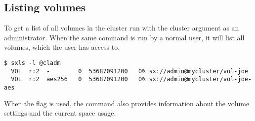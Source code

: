 \subsection{Listing volumes}
To get a list of all volumes in the cluster run  with the cluster
argument as an administrator. When the same command is run by a normal user,
it will list all volumes, which the user has access to.
\begin{lstlisting}
$ sxls -l @cladm
  VOL  r:2  -        0  53687091200   0% sx://admin@mycluster/vol-joe
  VOL  r:2  aes256   0  53687091200   0% sx://admin@mycluster/vol-joe-aes
\end{lstlisting}
When the  flag is used, the command also provides
information about the volume settings and the current space usage.
